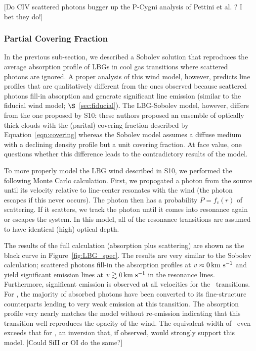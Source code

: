 \documentclass[12pt,preprint]{aastex}
\begin{document}
[Do CIV scattered photons bugger up the P-Cygni analysis of Pettini
et al. ? I bet they do!]
 
\subsubsection{Partial Covering Fraction}
\label{sec:Covering}

In the previous sub-section, we described a Sobolev solution that
reproduces the average absorption profile of LBGs in cool gas
transitions where scattered photons are ignored.  A proper analysis of
this wind model, however, predicts line profiles that are qualitatively
different from the ones observed because scattered photons fill-in
absorption and generate significant line emission (similar to the
fiducial wind model; $\S$~\ref{sec:fiducial}).
The LBG-Sobolev model, however, differs from
the one proposed by S10:  these authors proposed an ensemble of optically
thick clouds with the (parital) covering fraction described by
Equation~\ref{eqn:covering} whereas the Sobolev model assumes
a diffuse medium with a declining density profile but a unit covering
fraction.  At face value, one questions whether this difference leads to
the contradictory results of the model. 

To more properly model the LBG wind described in S10, we 
performed the following Monte Carlo calculation.  First, we propogated
a photon from the source until its velocity relative to line-center
resonates with the wind (the photon escapes if this never occurs).
The photon then has a probability $P = f_c(r)$ of scattering.  If it
scatters, we track the photon until it comes into
resonance again or escapes the system.  In this model, all of the
resonance transitions are assumed to have identical (high) optical
depth. 

The results of the full calculation (absorption plus scattering) are
shown as the black curve in Figure~\ref{fig:LBG_spec}.  The results
are very similar to the Sobolev calculation; scattered photons fill-in
the absorption profiles at $v \approx 0 \, {\rm km~s^{-1}}$ and yield significant
emission lines at $v \gtrsim 0 \, {\rm km~s^{-1}}$ in the resonance
lines. Furthermore, significant emission is observed at
all velocities for the \feiis\ transitions.  For \feiia,
the majority of absorbed photons have been converted to its
fine-structure counterparts lending to very weak emission at this
transition. The absorption profile very nearly matches the
model without re-emission indicating that this transition well
reproduces the opacity of the wind.  
The equivalent width of \feiia\ even exceeds that for \feiib, an
inversion that, if observed, would strongly support this model.
[Could SiII or OI do the same?]
\end{document}
